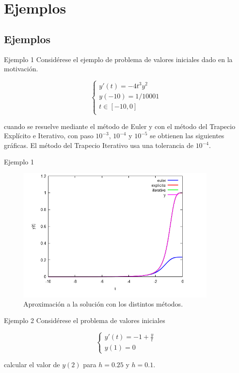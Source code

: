 \section{Ejemplos} \label{ejemplos}

\subsection{Ejemplos} \label{ejemplo1}
		\begin{frame}{Ejemplo 1}
			Considérese el ejemplo de problema de valores iniciales dado en la motivación.

			\begin{equation*}
			\begin{cases}
			y'(t) = -4 t^3 y^2 \\
			y(-10) = 1/10001 \\
			t \in [-10,0] \\
			\end{cases}
			\end{equation*}

			cuando se resuelve mediante el método de Euler y con el método del Trapecio Explícito e Iterativo, con paso $10^{-3}$, $10^{-4}$ y  $10^{-5}$ se obtienen las siguientes gráficas. El método del Trapecio Iterativo usa una tolerancia de $10^{-4}$.
		\end{frame}



		\begin{frame}{Ejemplo 1}	
			\begin{figure}[h]
				\centering
				\includegraphics[width=10cm]{./Images/ej1.png}
				\caption{Aproximación a la solución con los distintos métodos.}
			\end{figure}
		\end{frame}	
		
		
		\begin{frame}{Ejemplo 2}
			Considérese el problema de valores iniciales
			
			\begin{equation*}
			\begin{cases}
			y'(t) = -1 + \frac{y}{t} \\
			y(1) = 0
			\end{cases}
			\end{equation*}
			
			calcular el valor de $y(2)$ para $h=0.25$ y $h=0.1$.			
		\end{frame}
		
